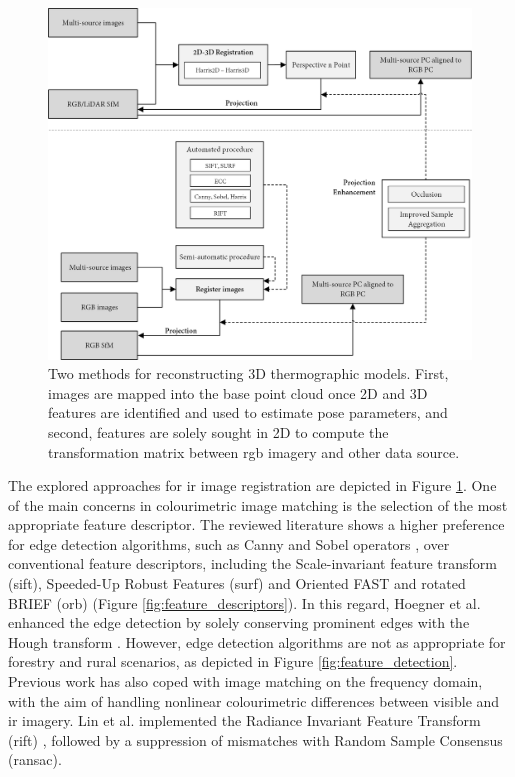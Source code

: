 \begin{figure}[ht]
	\includegraphics[width=\linewidth]{figs/context/fusion_03.png}
	\caption{Two methods for reconstructing 3D thermographic models. First, images are mapped into the base point cloud once 2D and 3D features are identified and used to estimate pose parameters, and second, features are solely sought in 2D to compute the transformation matrix between \acrshort{rgb} imagery and other data source. }
    \label{fig:fusion_data_03}
\end{figure}

The explored approaches for \acrshort{ir} image registration are depicted in Figure \ref{fig:fusion_data_03}. One of the main concerns in colourimetric image matching is the selection of the most appropriate feature descriptor. The reviewed literature shows a higher preference for edge detection algorithms, such as Canny and Sobel operators \cite{hoegner_3d_2016, hoegner_evaluation_2016}, over conventional feature descriptors, including the Scale-invariant feature transform (\acrshort{sift}), Speeded-Up Robust Features (\acrshort{surf}) and Oriented FAST and rotated BRIEF (\acrshort{orb}) (Figure \ref{fig:feature_descriptors}). In this regard, Hoegner et al. \cite{hoegner_evaluation_2016} enhanced the edge detection by solely conserving prominent edges with the Hough transform \cite{hoegner_evaluation_2016}. However, edge detection algorithms are not as appropriate for forestry and rural scenarios, as depicted in Figure \ref{fig:feature_detection}. Previous work has also coped with image matching on the frequency domain, with the aim of handling nonlinear colourimetric differences between visible and \acrshort{ir} imagery. Lin et al. \cite{lin_fusion_2019} implemented the Radiance Invariant Feature Transform (\acrshort{rift}) \cite{lin_fusion_2019}, followed by a suppression of mismatches with Random Sample Consensus (\acrshort{ransac}).

